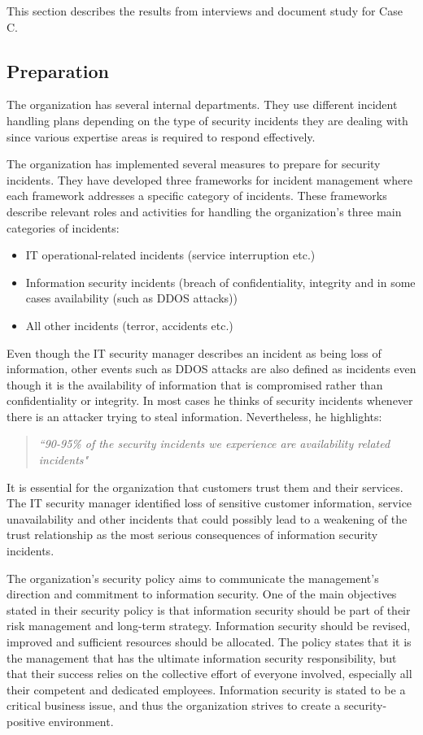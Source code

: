 This section describes the results from interviews and document study for Case C.

\subsection{Preparation}
The organization has several internal departments. They use different incident handling plans depending on the type of security incidents they are dealing with since various expertise areas is required to respond effectively. 

The organization has implemented several measures to prepare for security incidents. They have developed three frameworks for incident management where each framework addresses a specific category of incidents. These frameworks describe relevant roles and activities for handling the organization's three main categories of incidents:

\begin{itemize}
\item IT operational-related incidents (service interruption etc.)
\item Information security incidents (breach of confidentiality, integrity and in some cases availability (such as DDOS attacks))
\item All other incidents (terror, accidents etc.)
\end{itemize}
 
Even though the IT security manager describes an incident as being loss of information, other events such as DDOS attacks are also defined as incidents even though it is the availability of information that is compromised rather than confidentiality or integrity. In most cases he thinks of security incidents whenever there is an attacker trying to steal information. Nevertheless, he highlights:

\begin{quote}
\textit{``90-95\% of the security incidents we experience are availability related incidents"}
\end{quote} 
 
It is essential for the organization that customers trust them and their services. The IT security manager identified loss of sensitive customer information, service unavailability and other incidents that could possibly lead to a weakening of the trust relationship as the most serious consequences of information security incidents. 

The organization's security policy aims to communicate the management's direction and commitment to information security. One of the main objectives stated in their security policy is that information security should be part of their risk management and long-term strategy. Information security should be revised, improved and sufficient resources should be allocated. The policy states that it is the management that has the ultimate information security responsibility, but that their success relies on the collective effort of everyone involved, especially all their competent and dedicated employees. Information security is stated to be a critical business issue, and thus the organization strives to create a security-positive environment.

